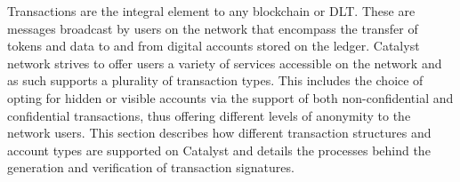 Transactions are the integral element to any blockchain or DLT. These are messages broadcast by users on the network that encompass the transfer of tokens and data to and from digital accounts stored on the ledger. Catalyst network strives to offer users a variety of services accessible on the network and as such supports a plurality of transaction types. This includes the choice of opting for hidden or visible accounts via the support of both non-confidential and confidential transactions, thus offering different levels of anonymity to the network users. This section describes how different transaction structures and account types are supported on Catalyst and details the processes behind the generation and verification of transaction signatures. 